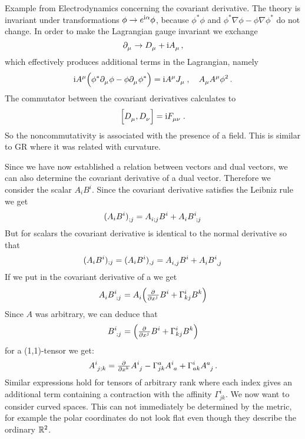 \begin{remark} Example from Electrodynamics concerning the covariant derivative. 
The theory is invariant under transformations $\phi\to e^{\mathrm{i} \alpha}\phi$, 
because $\phi^*\phi$ and $\phi^*\nabla\phi-\phi\nabla\phi^*$ do not change.
In order to make the Lagrangian gauge invariant we exchange
\begin{equation}
\tensor{\partial}{_\mu}\to\tensor{D}{_\mu}+\imI\tensor{A}{_\mu}\, ,
\end{equation}
which effectively produces additional terms in the Lagrangian, namely
\begin{equation}
\imI\tensor{A}{^\mu}\left(\phi^*\tensor{\partial}{_\mu}\phi
-\phi\tensor{\partial}{_\mu}\phi^*\right)=\imI\tensor{A}{^\mu}\tensor{J}{_\mu}\,,
\quad\tensor{A}{_\mu}\tensor{A}{^\mu}\phi^2\,.
\end{equation}
The commutator between the covariant derivatives calculates to  
\begin{equation}
\left[\tensor{D}{_\mu},\tensor{D}{_\nu}\right]=\imI \tensor{F}{_\mu_\nu}\,.
\end{equation}
So the noncommutativity is associated with the presence of a field. This is
similar to GR where it was related with curvature. 
\end{remark}
Since we have now established a relation between vectors and dual vectors, we
can also determine the covariant derivative of a dual vector. Therefore we
consider the scalar $A_iB^i$. Since the covariant derivative satisfies the
Leibniz rule we get
\begin{align}
\tensor{(A_iB^i)}{_{;j}} =
\tensor{A}{_i_;_j}\tensor{B}{^i}+\tensor{A}{_i}\tensor{B}{^i_;_j}
\end{align}
But for scalars the covariant derivative is identical to the normal derivative
so that 
\begin{align}
(A_iB^i)_{;j} =(A_iB^i)_{,j}=
\tensor{A}{_i_,_j}\tensor{B}{^i}+\tensor{A}{_i}\tensor{B}{^i_,_j}
\end{align}
If we put in the covariant derivative of a we get 
\begin{equation}
\tensor{A}{_i}\tensor{B}{^i_;_j}=\tensor{A}{_i}\left(\pd{}{{x^j}}B^i+\Gamma^i_{kj}\tensor{B}{^k}\right)
\end{equation}
Since $A$ was arbitrary, we can deduce that
\begin{equation}
\tensor{B}{^i_;_j}=\left(\pd{}{{x^j}}B^i+\Gamma^i_{kj}\tensor{B}{^k}\right)
\end{equation}
for a (1,1)-tensor we get:
\begin{equation}
\tensor{A}{^i_j_;_k}=\pd{}{{x^k}}\tensor{A}{^i_j}-\Gamma^a_{jk}\tensor{A}{^i_a}+\Gamma^i_{ak}\tensor{A}{^a_j}\,
.\end{equation}
Similar expressions hold for tensors of arbitrary rank where each index gives an
additional term containing a contraction with the affinity $\Gamma^i_{jk}$. 
We now want to consider curved spaces. This can not immediately be determined by
the metric, for example the polar coordinates do not look flat even though they
describe the ordinary $\mathbb{R}^2$.
